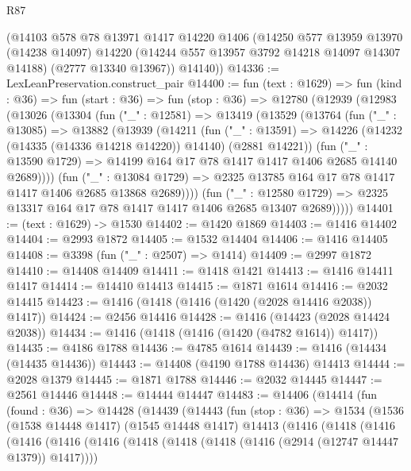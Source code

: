 \begin{lexlean}{R87}
\begin{coremodule}
{{      (@14103
        @578
        @78
        @13971
        @1417
        @14220
        @1406
        (@14250
          @577
          @13959
          @13970
          (@14238 @14097)
          @14220
          (@14244 @557 @13957 @3792 @14218 @14097 @14307 @14188)
          (@2777 @13340 @13967))
        @14140))
@14336 := LexLeanPreservation.construct_pair
@14400 := fun (text : @1629) =>
  fun (kind : @36) =>
  fun (start : @36) =>
  fun (stop : @36) =>
  @12780
    (@12939
      (@12983
        (@13026
          (@13304
            (fun ("_" : @12581) =>
            @13419
              (@13529
                (@13764
                  (fun ("_" : @13085) =>
                  @13882
                    (@13939
                      (@14211
                        (fun ("_" : @13591) =>
                        @14226 (@14232 (@14335 (@14336 @14218 @14220)) @14140) (@2881 @14221))
                        (fun ("_" : @13590 @1729) =>
                        @14199 @164 @17 @78 @1417 @1417 @1406 @2685 @14140 @2689))))
                  (fun ("_" : @13084 @1729) =>
                  @2325 @13785 @164 @17 @78 @1417 @1417 @1406 @2685 @13868 @2689))))
            (fun ("_" : @12580 @1729) =>
            @2325 @13317 @164 @17 @78 @1417 @1417 @1406 @2685 @13407 @2689)))))
@14401 := (text : @1629) -> @1530
@14402 := @1420 @1869
@14403 := @1416 @14402
@14404 := @2993 @1872
@14405 := @1532 @14404
@14406 := @1416 @14405
@14408 := @3398 (fun ("_" : @2507) => @1414)
@14409 := @2997 @1872
@14410 := @14408 @14409
@14411 := @1418 @1421
@14413 := @1416 @14411 @1417
@14414 := @14410 @14413
@14415 := @1871 @1614
@14416 := @2032 @14415
@14423 := @1416 (@1418 (@1416 (@1420 (@2028 @14416 @2038)) @1417))
@14424 := @2456 @14416
@14428 := @1416 (@14423 (@2028 @14424 @2038))
@14434 := @1416 (@1418 (@1416 (@1420 (@4782 @1614)) @1417))
@14435 := @4186 @1788
@14436 := @4785 @1614
@14439 := @1416 (@14434 (@14435 @14436))
@14443 := @14408 (@4190 @1788 @14436) @14413
@14444 := @2028 @1379
@14445 := @1871 @1788
@14446 := @2032 @14445
@14447 := @2561 @14446
@14448 := @14444 @14447
@14483 := @14406
    (@14414
      (fun (found : @36) =>
      @14428
        (@14439
          (@14443
            (fun (stop : @36) =>
            @1534
              (@1536
                (@1538 @14448 @1417)
                (@1545 @14448 @1417)
                @14413
                (@1416
                  (@1418
                    (@1416
                      (@1416
                        (@1416
                          (@1416
                            (@1418 (@1418 (@1418 (@1416 (@2914 (@12747 @14447 @1379)) @1417))))
}}
\end{coremodule}
\end{lexlean}
